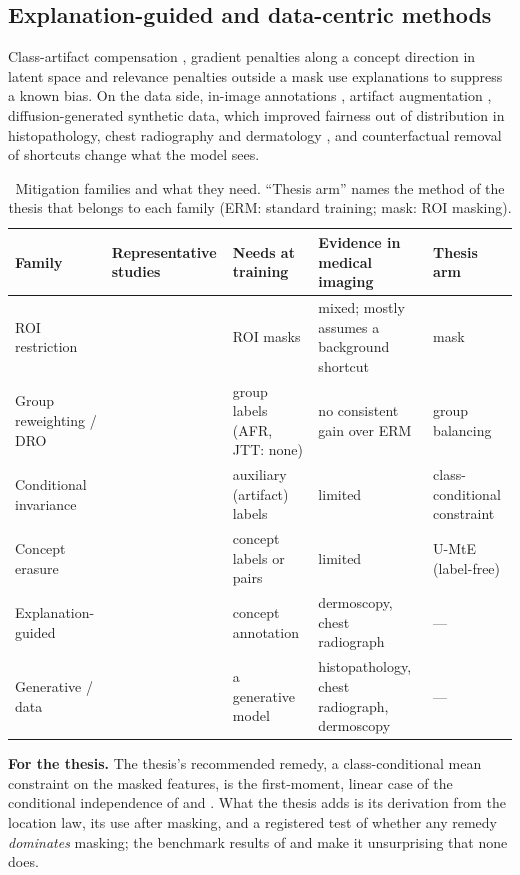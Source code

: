 \documentclass[11pt,a4paper]{article}
\newcommand{\takeaway}[1]{\par\smallskip\noindent\colorbox{gray!12}{\parbox{\dimexpr\linewidth-2\fboxsep}{\small\textbf{For the thesis.} #1}}\par\medskip}
\begin{document}
\subsection{Explanation-guided and data-centric methods}
Class-artifact compensation \citep{anders2022clever}, gradient penalties along a concept direction in latent space
\citep{dreyer2024hope} and relevance penalties outside a mask \citep{bassi2024isnet} use explanations to suppress a known
bias. On the data side, in-image annotations \citep{rueckel2021pneumothorax}, artifact augmentation
\citep{pewton2024dca}, diffusion-generated synthetic data, which improved fairness out of distribution in
histopathology, chest radiography and dermatology \citep{ktena2024generative}, and counterfactual removal of shortcuts
\citep{weng2024fastdime} change what the model sees.

\begin{table}[t]\centering\small
\caption{Mitigation families and what they need. ``Thesis arm'' names the method of the thesis that belongs to each
family (ERM: standard training; mask: ROI masking).}\label{tab:mitigation}
\begin{tabular}{P{2.7cm}P{3.3cm}P{2.2cm}P{3.5cm}P{2.8cm}}\toprule
Family & Representative studies & Needs at training & Evidence in medical imaging & Thesis arm \\\midrule
ROI restriction & \citet{maron2021confounding,bassi2024isnet} & ROI masks & mixed; mostly assumes a background shortcut \citep[in-mask confounders noted by][]{viviano2021saliency} & mask \\
Group reweighting / DRO & \citet{krueger2021rex,kirichenko2023dfr,qiu2023afr} & group labels (AFR, JTT: none) & no consistent gain over ERM \citep{zong2023medfair} & group balancing \\
Conditional invariance & \citet{veitch2021counterfactual,makar2022causally,puli2022nurd} & auxiliary (artifact) labels & limited & class-conditional constraint \\
Concept erasure & \citet{belrose2023leace,holstege2025splince} & concept labels or pairs & limited & U-MtE (label-free) \\
Explanation-guided & \citet{anders2022clever,dreyer2024hope,pahde2023r2r} & concept annotation & dermoscopy, chest radiograph & --- \\
Generative / data & \citet{ktena2024generative,weng2024fastdime} & a generative model & histopathology, chest radiograph, dermoscopy & --- \\\bottomrule
\end{tabular}\end{table}
\takeaway{The thesis's recommended remedy, a class-conditional mean constraint on the masked features, is the
first-moment, linear case of the conditional independence of \citet{veitch2021counterfactual} and
\citet{makar2022causally}. What the thesis adds is its derivation from the location law, its use after masking, and a
registered test of whether any remedy \emph{dominates} masking; the benchmark results of \citet{yang2023change} and
\citet{zong2023medfair} make it unsurprising that none does.}
\end{document}
